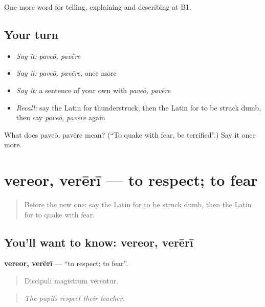 \begin{grammarlens}[title={What you've built}]
One more word for telling, explaining and describing at B1.
\end{grammarlens}

\subsection*{Your turn}
\begin{itemize}
\raggedright
  \item \emph{Say it:} \emph{paveō, pavēre}
  \item \emph{Say it:} \emph{paveō, pavēre}, once more
  \item \emph{Say it:} a sentence of your own with \emph{paveō, pavēre}
  \item \emph{Recall:} say the Latin for thunderstruck, then the Latin for to be struck dumb, then say \emph{paveō, pavēre} again
\end{itemize}

\begin{tcolorbox}[breakable,colback=teal!4,colframe=teal!35!black,title={Before you move on}]
What does paveō, pavēre mean? (\textquotedblleft{}To quake with fear, be terrified\textquotedblright{}.) Say it once more.
\end{tcolorbox}
\section[vereor, verērī]{vereor, verērī — to respect; to fear}

\label{lesson:LA-C496-vereor}



\begin{quote}
Before the new one: say the Latin for to be struck dumb, then the Latin for to quake with fear.
\end{quote}

\subsection*{You'll want to know: vereor, verērī}
\textbf{vereor, verērī} — \textquotedblleft{}to respect; to fear\textquotedblright{}.

\begin{quote}
Discipulī magistrum verentur.
\end{quote}

\begin{quote}
\emph{The pupils respect their teacher.}
\end{quote}

